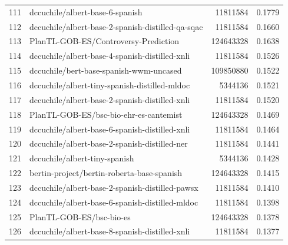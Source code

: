 {\begin{xltabular}{\textwidth}{l X rc}
    111              & dccuchile/albert-base-6-spanish                                            & 11811584      & 0.1779       \\
    112              & dccuchile/albert-base-2-spanish-distilled-qa-sqac                          & 11811584      & 0.1660       \\
    113              & PlanTL-GOB-ES/Controversy-Prediction                                       & 124643328     & 0.1638       \\
    114              & dccuchile/albert-base-4-spanish-distilled-xnli                             & 11811584      & 0.1526       \\
    115              & dccuchile/bert-base-spanish-wwm-uncased                                    & 109850880     & 0.1522       \\
    116              & dccuchile/albert-tiny-spanish-distilled-mldoc                              & 5344136       & 0.1521       \\
    117              & dccuchile/albert-base-2-spanish-distilled-xnli                             & 11811584      & 0.1520       \\
    118              & PlanTL-GOB-ES/bsc-bio-ehr-es-cantemist                                     & 124643328     & 0.1469       \\
    119              & dccuchile/albert-base-6-spanish-distilled-xnli                             & 11811584      & 0.1464       \\
    120              & dccuchile/albert-base-2-spanish-distilled-ner                              & 11811584      & 0.1441       \\
    121              & dccuchile/albert-tiny-spanish                                              & 5344136       & 0.1428       \\
    122              & bertin-project/bertin-roberta-base-spanish                                 & 124643328     & 0.1415       \\
    123              & dccuchile/albert-base-2-spanish-distilled-pawsx                            & 11811584      & 0.1410       \\
    124              & dccuchile/albert-base-6-spanish-distilled-mldoc                            & 11811584      & 0.1398       \\
    125              & PlanTL-GOB-ES/bsc-bio-es                                                   & 124643328     & 0.1378       \\
    126              & dccuchile/albert-base-8-spanish-distilled-xnli                             & 11811584      & 0.1377       \\

\end{xltabular}}
